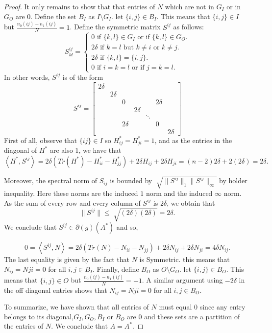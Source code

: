 \documentclass[12pt]{amsart}
\theoremstyle{remark}
\begin{document}
\begin{proof}
It only remains to show that that entries of $N$ which are not in $G_I$ or in $G_O$ are $0$. Define the set $B_I$ as $I\setminus G_I$.
let $\{i,j\} \in B_I$. This means that $\{i,j\}  \in I$ but $\frac{n_0(ij)-n_1(ij)}{N}=1$.
Define the symmetric matrix $S^{ij}$ as follows:
\begin{equation}
S^{ij}_{kl} = 
\begin{cases}
0 \text{ if } \{k,l\}\in G_I \text{ or if } \{k,l\}\in G_O. \\
2\delta \text{ if } k=l \text{ but } k\neq i \text{ or } k\neq j. \\ 
2\delta \text{ if } \{k,l\}=\{i,j\}. \\
0 \text{ if } i=k=l \text{ or if } j=k=l.
\end{cases}
\end{equation}
In other words, $S^{ij}$ is of the form
\[
S^{ij} = 
 \begin{bmatrix}
    2\delta & & & & & & \\
   & 2\delta&  &  & & &\\
   & & 0&  &  &  2\delta& \\
   & & & 2\delta & & & \\
   & & & & \ddots & &\\
   &  & 2\delta & & & 0& \\
   &  & &  &  &  &2\delta
  \end{bmatrix}
\]
First of all, observe that $\{ij\} \in I $ so $H^*_{ij}=H^*_{ji}=1$, and as the entries in the diagonal of $H^*$ are also $1$, we have that
\[ \left \langle H^*,S^{ij} \right\rangle =2\delta(Tr(H^*)-H^*_{ii}-H^*_{jj}) + 2\delta H_{ij}+  2\delta H_{ji}  =(n-2) 2\delta+2(2\delta) =2\delta.\]

Moreover, the spectral norm of $S_{ij}$ is bounded by $\sqrt[]{\|S^{ij}\|_1 \|S^{ij}\|_{\infty}}$ by holder inequality. Here these norms are the induced $1$ norm and the induced $\infty$ norm. As the sum of  every row and every column of $S^{ij}$ is $2\delta$, we obtain that
\[\|S^{ij}\| \leq \sqrt[]{(2\delta)(2\delta)} = 2\delta.\]
We conclude that $S^{ij} \in \partial(g)(A^*)$ and so,

\[
0 = \left \langle S^{ij},N \right \rangle = 2\delta (Tr(N)-N_{ii}-N_{jj})+ 2\delta N_{ij} + 2\delta N_{ji} = 4\delta N_{ij}. 
\]
The last equality is given by the fact that $N$ is Symmetric. this means that 
$N_{ij}=N{ji}=0$ for all ${i,j} \in B_I$.
Finally, define $B_O$ as $O\setminus G_O$.
let $\{i,j\} \in B_O$. This means that $\{i,j\}  \in O$ but $\frac{n_0(ij)-n_1(ij)}{N}=-1$.
A similar argument using $-2\delta$ in the off diagonal entries shows that
$N_{ij}=N{ji}=0$ for all ${i,j} \in B_O$.

To summarize, we have shown that all entries of $N$ must equal $0$ since any entry belongs to its diagonal,$ G_I,G_O,B_I$ or $B_O$ are $0$ and these sets are a partition of the entries of $N$.
We conclude that $\bar{A}=A^*$.
\end{proof}
\end{document}

